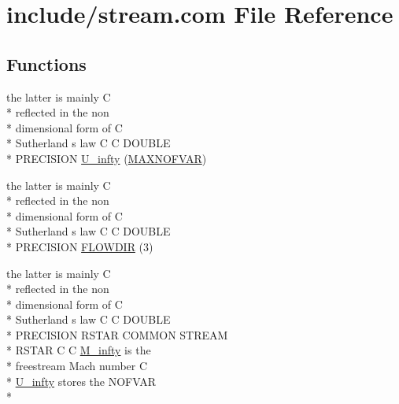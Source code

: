 \hypertarget{home_2abonfi_2_c_f_d__codes_2_eul_f_s_83_84_2include_2stream_8com}{\section{include/stream.com File Reference}
\label{home_2abonfi_2_c_f_d__codes_2_eul_f_s_83_84_2include_2stream_8com}
}
\subsection*{Functions}
\begin{DoxyCompactItemize}
\item 
the latter is mainly C \\*
reflected in the non \\*
dimensional form of C \\*
Sutherland s law C C D\-O\-U\-B\-L\-E \\*
P\-R\-E\-C\-I\-S\-I\-O\-N \hyperlink{home_2abonfi_2_c_f_d__codes_2_eul_f_s_83_84_2include_2stream_8com_a3306f725a42d6173548f0867aa4313ef}{U\-\_\-infty} (\hyperlink{msa20_2home_2abonfi_2_c_f_d__codes_2_eul_f_s_83_82_83_2include_2paramt_8h_ae08fa28f58a75033834af08d1f9359ce}{M\-A\-X\-N\-O\-F\-V\-A\-R})
\item 
the latter is mainly C \\*
reflected in the non \\*
dimensional form of C \\*
Sutherland s law C C D\-O\-U\-B\-L\-E \\*
P\-R\-E\-C\-I\-S\-I\-O\-N \hyperlink{home_2abonfi_2_c_f_d__codes_2_eul_f_s_83_84_2include_2stream_8com_a52f84db6b16caac3d51050972a7612c7}{F\-L\-O\-W\-D\-I\-R} (3)
\item 
the latter is mainly C \\*
reflected in the non \\*
dimensional form of C \\*
Sutherland s law C C D\-O\-U\-B\-L\-E \\*
P\-R\-E\-C\-I\-S\-I\-O\-N R\-S\-T\-A\-R C\-O\-M\-M\-O\-N S\-T\-R\-E\-A\-M \\*
R\-S\-T\-A\-R C C \hyperlink{msa20_2home_2abonfi_2_c_f_d__codes_2_eul_f_s_83_82_83_2include_2stream_8com_a57c765efd76d44669f6966962bda2d72}{M\-\_\-infty} is the \\*
freestream Mach number C \\*
\hyperlink{msa20_2home_2abonfi_2_c_f_d__codes_2_eul_f_s_83_82_83_2include_2stream_8com_a3306f725a42d6173548f0867aa4313ef}{U\-\_\-infty} stores the N\-O\-F\-V\-A\-R \\*

\end{DoxyCompactItemize}
